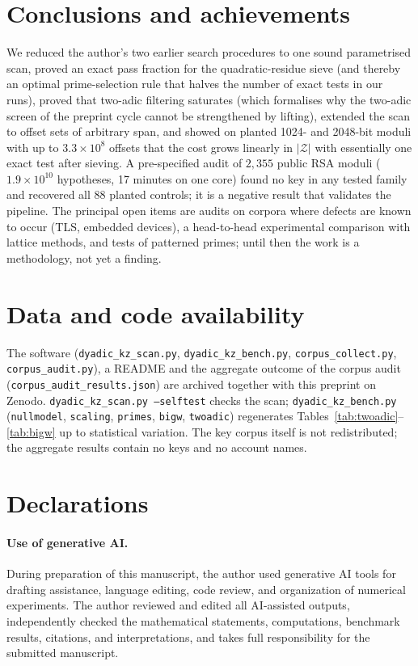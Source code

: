 \documentclass[11pt,a4paper]{article}
\newcommand{\code}[1]{\texttt{#1}}
\begin{document}
\section{Conclusions and achievements}
We reduced the author's two earlier search procedures to one sound parametrised scan, proved an exact pass fraction for the quadratic-residue sieve (and thereby an optimal prime-selection rule that halves the number of exact tests in our runs), proved that two-adic filtering saturates (which formalises why the two-adic screen of the preprint cycle cannot be strengthened by lifting), extended the scan to offset sets of arbitrary span, and showed on planted 1024- and 2048-bit moduli with up to $3.3\times10^{8}$ offsets that the cost grows linearly in $|\mathcal Z|$ with essentially one exact test after sieving. A pre-specified audit of $2{,}355$ public RSA moduli ($1.9\times10^{10}$ hypotheses, 17 minutes on one core) found no key in any tested family and recovered all 88 planted controls; it is a negative result that validates the pipeline. The principal open items are audits on corpora where defects are known to occur (TLS, embedded devices), a head-to-head experimental comparison with lattice methods, and tests of patterned primes; until then the work is a methodology, not yet a finding.

\section*{Data and code availability}
The software (\code{dyadic\_kz\_scan.py}, \code{dyadic\_kz\_bench.py}, \code{corpus\_collect.py}, \code{corpus\_audit.py}), a README and the aggregate outcome of the corpus audit (\code{corpus\_audit\_results.json}) are archived together with this preprint on Zenodo. \code{dyadic\_kz\_scan.py --selftest} checks the scan; \code{dyadic\_kz\_bench.py} (\code{nullmodel}, \code{scaling}, \code{primes}, \code{bigw}, \code{twoadic}) regenerates Tables~\ref{tab:twoadic}--\ref{tab:bigw} up to statistical variation. The key corpus itself is not redistributed; the aggregate results contain no keys and no account names.

\section*{Declarations}
\paragraph{Use of generative AI.} During preparation of this manuscript, the author used generative AI tools for drafting assistance, language editing, code review, and organization of numerical experiments. The author reviewed and edited all AI-assisted outputs, independently checked the mathematical statements, computations, benchmark results, citations, and interpretations, and takes full responsibility for the submitted manuscript.
\end{document}
